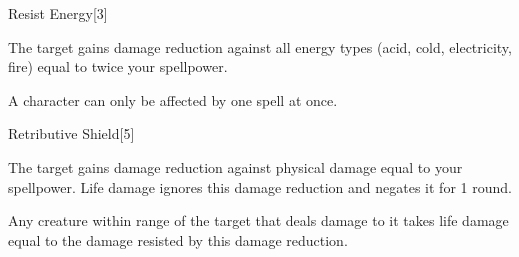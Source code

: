 \begin{spellsection}[Greater]{Resist Energy}[3]
    \begin{spellheader}
    \end{spellheader}
    \begin{spellcontent}
        \begin{spelltargetinginfo}
        \end{spelltargetinginfo}
        \begin{spelleffects}
            \spelleffect The target gains damage reduction against all energy types (acid, cold, electricity, fire) equal to twice your spellpower.
            \spelldur \durpersonallong
        \end{spelleffects}
    \end{spellcontent}
    \begin{spellfooter}
        \spellnotes A character can only be affected by one  spell at once.
        \miscastexplode
    \end{spellfooter}
\end{spellsection}

\begin{spellsection}{Retributive Shield}[5]
    \begin{spellheader}
    \end{spellheader}
    \begin{spellcontent}
        \begin{spelltargetinginfo}
        \end{spelltargetinginfo}
        \begin{spelleffects}
            \spelleffect The target gains damage reduction against physical damage equal to your spellpower. Life damage ignores this damage reduction and negates it for 1 round.

            \par Any creature within \rngmed range of the target that deals damage to it takes life damage equal to the damage resisted by this damage reduction.
            \spelldur \durshort
        \end{spelleffects}
    \end{spellcontent}
    \begin{spellfooter}
        \miscastrandom
    \end{spellfooter}
\end{spellsection}

